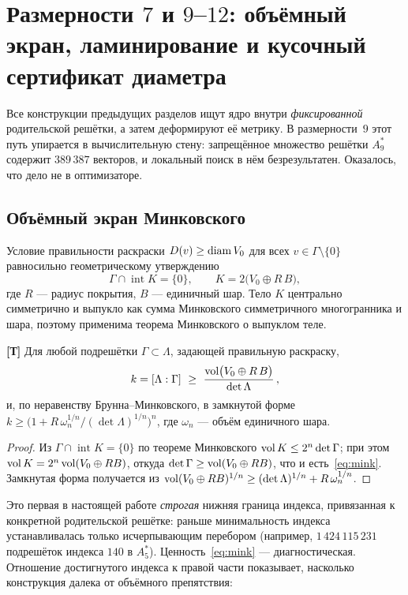 \section{Размерности $7$ и $9$--$12$: объёмный экран, ламинирование и
кусочный сертификат диаметра}\label{sec:dim912}

Все конструкции предыдущих разделов ищут ядро внутри \emph{фиксированной}
родительской решётки, а затем деформируют её метрику. В размерности~$9$ этот
путь упирается в вычислительную стену: запрещённое множество решётки $A_9^*$
содержит $389\,387$ векторов, и локальный поиск в нём безрезультатен. Оказалось,
что дело не в оптимизаторе.

\subsection{Объёмный экран Минковского}\label{ssec:mink}

Условие правильности раскраски $D(v)\ge\operatorname{diam} V_0$ для всех $v\in\Gamma
\setminus\{0\}$ равносильно геометрическому утверждению
\[
\Gamma\cap\operatorname{int}K=\{0\},\qquad K=2\bigl(V_0\oplus R\,B\bigr),
\]
где $R$ --- радиус покрытия, $B$ --- единичный шар. Тело $K$ центрально
симметрично и выпукло как сумма Минковского симметричного многогранника и шара,
поэтому применима теорема Минковского о выпуклом теле.

\begin{proposition}\label{prop:mink}
\textbf{[Т]} Для любой подрешётки $\Gamma\subset\Lambda$, задающей правильную
раскраску,
\begin{equation}\label{eq:mink}
k=[\Lambda:\Gamma]\ \ge\ \frac{\operatorname{vol}\bigl(V_0\oplus R\,B\bigr)}{\det\Lambda}\,,
\end{equation}
и, по неравенству Брунна--Минковского, в замкнутой форме
$k\ge\bigl(1+R\,\omega_n^{1/n}/(\det\Lambda)^{1/n}\bigr)^n$, где $\omega_n$ ---
объём единичного шара.
\end{proposition}

\begin{proof}
Из $\Gamma\cap\operatorname{int}K=\{0\}$ по теореме Минковского
$\operatorname{vol} K\le2^n\det\Gamma$; при этом $\operatorname{vol} K=2^n\operatorname{vol}(V_0\oplus RB)$, откуда
$\det\Gamma\ge\operatorname{vol}(V_0\oplus RB)$, что и есть~\eqref{eq:mink}. Замкнутая форма
получается из $\operatorname{vol}(V_0\oplus RB)^{1/n}\ge(\det\Lambda)^{1/n}+R\,\omega_n^{1/n}$.
\end{proof}

Это первая в настоящей работе \emph{строгая} нижняя граница индекса, привязанная
к конкретной родительской решётке: раньше минимальность индекса устанавливалась
только исчерпывающим перебором (например, $1\,424\,115\,231$ подрешёток индекса
$140$ в $A_5^*$). Ценность~\eqref{eq:mink} --- диагностическая. Отношение
достигнутого индекса к правой части показывает, насколько конструкция далека от
объёмного препятствия:

